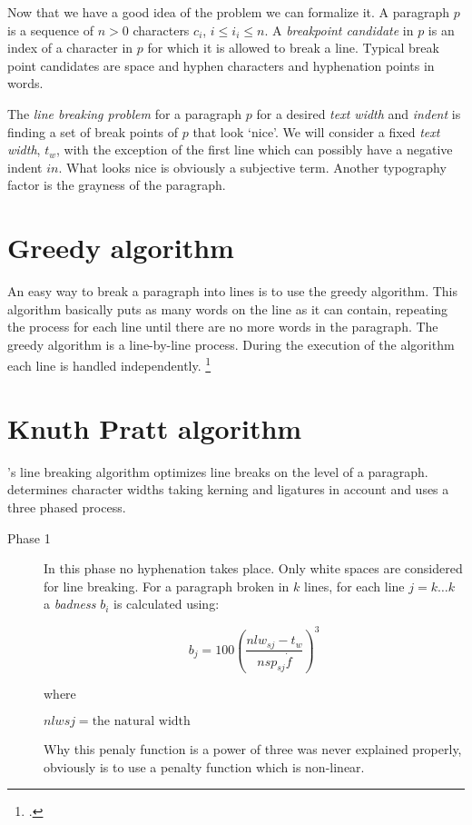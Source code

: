 {{Now that we have a good idea of the problem we can formalize it. A paragraph $p$ is a sequence of $n>0$ characters $c_i$,  $i\leq i_i \leq n$.
A \textit{breakpoint candidate} in $p$ is an index of a character in $p$ for which it is allowed to break a line. Typical break point candidates are space and hyphen characters and hyphenation points in words.

The \textit{line breaking problem} for a paragraph $p$ for a desired \textit{text width} and \textit{indent} is finding a set of break points of $p$ that look `nice'. We will consider a fixed \textit{text width}, $t_w$, with the exception of the first line which can possibly have a negative indent $in$. What looks nice is obviously a subjective term. Another typography factor is the grayness of the paragraph. 

\section{Greedy algorithm}

An easy way to break a paragraph into lines is to use the greedy algorithm. This algorithm basically puts as many 
words on the line as it can contain, repeating the process for each line until there are no more words in the paragraph. The greedy algorithm is a line-by-line process. During the execution of the algorithm each line is handled independently. \footcite{elyaakoubi}



\section{Knuth Pratt algorithm}
\tex's line breaking algorithm optimizes line breaks on the level of a paragraph. \tex determines character widths taking kerning and ligatures in account and uses a three phased process. 

\begin{description}
\item[Phase 1] In this phase no hyphenation takes place. Only white spaces are considered  for line breaking. For a paragraph broken in $k$ lines, for each line $j=k\ldots k$  a \textit{badness} $b_i$ is calculated using:

$$b_j=100\left(\frac{nlw_{sj}-t_w}{nsp_{sj}\dot f}\right)^{3}$$

where 

$nlw{sj} = \text{the natural width}$

Why this penaly function is a power of three was never explained properly, obviously is to use a penalty function which is non-linear. 


\end{description}}}
